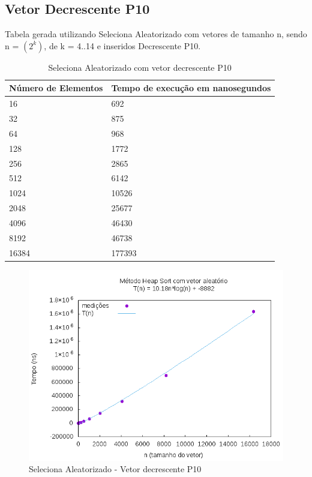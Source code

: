 \documentclass[12pt,a4paper,twoside]{report}
\begin{document}
\subsection{Vetor Decrescente P10}
Tabela gerada utilizando Seleciona Aleatorizado com vetores de tamanho n, sendo n = $(2^k)$, de k = 4..14 e inseridos Decrescente P10.
\begin{table}[H]
\centering
\caption{Seleciona Aleatorizado com vetor decrescente P10}
\label{my-label}
\begin{tabular}{|l|l|}
\hline
\multicolumn{1}{|c|}{\textbf{Número de Elementos}} & \multicolumn{1}{c|}{\textbf{Tempo de execução em nanosegundos}} \\ \hline
16 & 692 \\ \hline
32 & 875 \\ \hline
64 & 968 \\ \hline
128 & 1772 \\ \hline
256 & 2865 \\ \hline
512 & 6142 \\ \hline
1024 & 10526 \\ \hline
2048 & 25677 \\ \hline
4096 & 46430 \\ \hline
8192 & 46738 \\ \hline
16384 & 177393 \\ \hline

\end{tabular}
\end{table}

\begin{figure}[H]
    \centering
    \includegraphics[width=0.7\linewidth]{graficos/HeapSort/vIntAleatorio/vIntAleatorio.png}
  \caption{Seleciona Aleatorizado - Vetor decrescente P10}
\end{figure}
\end{document}
